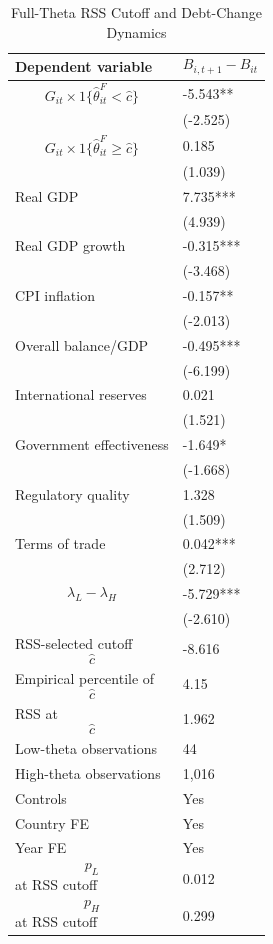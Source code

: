 \begin{table}[H]\centering
\begin{threeparttable}
\caption{Full-Theta RSS Cutoff and Debt-Change Dynamics}
\label{tab:deltaB_rss_cutoff_fulltheta}
\scriptsize
\begin{tabularx}{\textwidth}{lY}
\toprule
Dependent variable & $$B_{i,t+1}-B_{it}$$ \\
\midrule
$$G_{it}\times 1\{\widehat{\theta}^{F}_{it}<\widehat{c}\}$$ & -5.543** \\
 & (-2.525) \\
$$G_{it}\times 1\{\widehat{\theta}^{F}_{it}\geq\widehat{c}\}$$ & 0.185 \\
 & (1.039) \\
Real GDP & 7.735*** \\
 & (4.939) \\
Real GDP growth & -0.315*** \\
 & (-3.468) \\
CPI inflation & -0.157** \\
 & (-2.013) \\
Overall balance/GDP & -0.495*** \\
 & (-6.199) \\
International reserves & 0.021 \\
 & (1.521) \\
Government effectiveness & -1.649* \\
 & (-1.668) \\
Regulatory quality & 1.328 \\
 & (1.509) \\
Terms of trade & 0.042*** \\
 & (2.712) \\
$$\lambda_L-\lambda_H$$ & -5.729*** \\
 & (-2.610) \\
\midrule
RSS-selected cutoff $$\widehat{c}$$ & -8.616 \\
Empirical percentile of $$\widehat{c}$$ & 4.15 \\
RSS at $$\widehat{c}$$ & 1.962 \\
Low-theta observations & 44 \\
High-theta observations & 1,016 \\
Controls & Yes \\
Country FE & Yes \\
Year FE & Yes \\
$$p_L$$ at RSS cutoff & 0.012 \\
$$p_H$$ at RSS cutoff & 0.299 \\

\end{tabularx}
\end{threeparttable}
\end{table}
